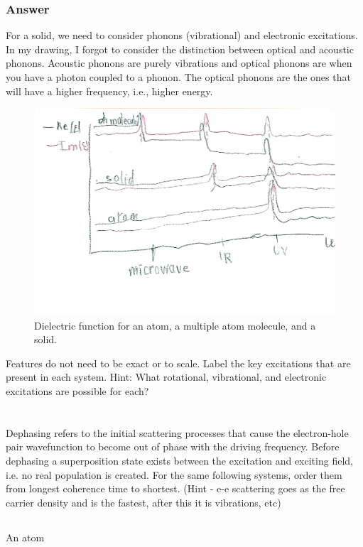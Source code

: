 \documentclass[12pt]{article}
\begin{document}
\subsubsection{Answer}
For a solid, we need to consider phonons (vibrational) and electronic excitations.
In my drawing, I forgot to consider the distinction between optical and acoustic phonons. Acoustic phonons are purely vibrations and optical phonons are when you have a photon coupled to a phonon. The optical phonons are the ones that will have a higher frequency, i.e., higher energy.\\
\begin{figure}[h]
\centering
\includegraphics[width=\textwidth]{dielectrics.jpg}
\caption{Dielectric function for an atom, a multiple atom molecule, and a solid.}
\end{figure}
Features do not need to be exact or to scale. Label the key excitations that are present in each system. Hint: What rotational, vibrational, and electronic excitations are possible for each?

\section{}
Dephasing refers to the initial scattering processes that cause the electron-hole pair wavefunction to become out of phase with the driving frequency. Before dephasing a superposition state exists between the excitation and exciting field, i.e. no real population is created. For the same following systems, order them from longest coherence time to shortest. (Hint - e-e scattering goes as the free carrier density and is the fastest, after this it is vibrations, etc)
\subsection{}
An atom
\end{document}

